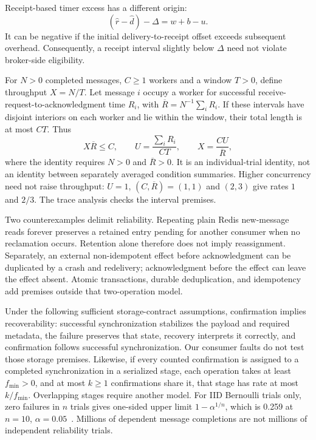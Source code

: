 \documentclass[11pt]{article}
\theoremstyle{definition}
\begin{document}
Receipt-based timer excess has a different origin:
\begin{equation}
(\widehat r-\widehat d)-\Delta=w+b-u.\label{eq:offset}
\end{equation}
It can be negative if the initial delivery-to-receipt offset exceeds subsequent overhead. Consequently, a receipt interval slightly below $\Delta$ need not violate broker-side eligibility.

For $N>0$ completed messages, $C\geq1$ workers and a window $T>0$, define throughput $X=N/T$. Let message $i$ occupy a worker for successful receive-request-to-acknowledgment time $R_i$, with $\overline R=N^{-1}\sum_iR_i$. If these intervals have disjoint interiors on each worker and lie within the window, their total length is at most $CT$. Thus
\begin{equation}
X\overline R\leq C,\qquad U=\frac{\sum_iR_i}{CT},\qquad X=\frac{CU}{\overline R},\label{eq:occupancy}
\end{equation}
where the identity requires $N>0$ and $\overline R>0$. It is an individual-trial identity, not an identity between separately averaged condition summaries. Higher concurrency need not raise throughput: $U=1$, $(C,\overline R)=(1,1)$ and $(2,3)$ give rates $1$ and $2/3$. The trace analysis checks the interval premises.

Two counterexamples delimit reliability. Repeating plain Redis new-message reads forever preserves a retained entry pending for another consumer when no reclamation occurs. Retention alone therefore does not imply reassignment. Separately, an external non-idempotent effect before acknowledgment can be duplicated by a crash and redelivery; acknowledgment before the effect can leave the effect absent. Atomic transactions, durable deduplication, and idempotency add premises outside that two-operation model.

Under the following sufficient storage-contract assumptions, confirmation implies recoverability: successful synchronization stabilizes the payload and required metadata, the failure preserves that state, recovery interprets it correctly, and confirmation follows successful synchronization. Our consumer faults do not test those storage premises. Likewise, if every counted confirmation is assigned to a completed synchronization in a serialized stage, each operation takes at least $f_{\min}>0$, and at most $k\geq1$ confirmations share it, that stage has rate at most $k/f_{\min}$. Overlapping stages require another model. For IID Bernoulli trials only, zero failures in $n$ trials gives one-sided upper limit $1-\alpha^{1/n}$, which is 0.259 at $n=10$, $\alpha=0.05$~\cite{clopper1934}. Millions of dependent message completions are not millions of independent reliability trials.
\end{document}
